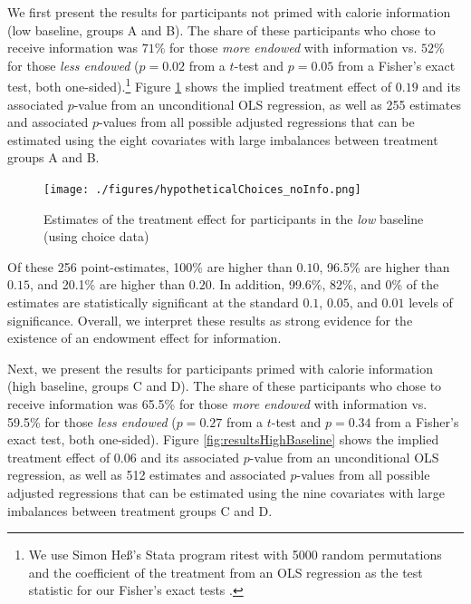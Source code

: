 We first present the results for participants not primed with calorie information (low baseline, groups A and B). The share of these participants who chose to receive information was $71\%$ for those \emph{more endowed} with information vs. $52\%$ for those \emph{less endowed} ($p=0.02$ from a $t$-test and $p=0.05$ from a Fisher’s exact test,  both one-sided).\footnote{We use Simon Heß’s Stata program ritest \citep{hessRandomizationInferenceStata2017} with 5000 random permutations and the coefficient of the treatment from an OLS regression as the test statistic for our Fisher’s exact tests \citet{imbensCausalInferenceStatistics2015}.} Figure \ref{fig:resultsLowBaseline} shows the implied treatment effect of $0.19$ and its associated $p$-value from an unconditional OLS regression, as well as 255 estimates and associated $p$-values from all possible adjusted regressions that can be estimated using the eight covariates with large imbalances between treatment groups A and B.

\begin{figure}[ht]
  \caption{Estimates of the treatment effect for participants in the \emph{low} baseline \\ (using choice data)}\label{fig:resultsLowBaseline}
  \begin{center}
  {\texttt{[image: ./figures/hypotheticalChoices\_noInfo.png]}}
  \end{center}
\end{figure}

Of these 256 point-estimates, 100\% are higher than $0.10$, 96.5\% are higher than $0.15$, and 20.1\% are higher than $0.20$. In addition, 99.6\%, 82\%, and 0\% of the estimates are statistically significant at the standard $0.1$, $0.05$, and $0.01$ levels of significance. Overall, we interpret these results as strong evidence for the existence of an endowment effect for information.

Next, we present the results for participants primed with calorie information (high baseline, groups C and D). The share of these participants who chose to receive information was 65.5\% for those \emph{more endowed} with information vs. 59.5\% for those \emph{less endowed} ($p=0.27$ from a $t$-test and $p=0.34$ from a Fisher’s exact test, both one-sided). Figure \ref{fig:resultsHighBaseline} shows the implied treatment effect of $0.06$ and its associated $p$-value from an unconditional OLS regression, as well as 512 estimates and associated $p$-values from all possible adjusted regressions that can be estimated using the nine covariates with large imbalances between treatment groups C and D.

